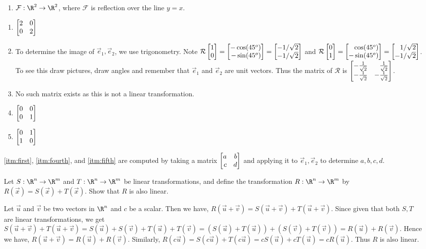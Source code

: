 \begin{exercises}
\begin{problist}
\begin{enumerate}
			\item $\mathcal F:\R^{2}\to\R^{2}$, where $\mathcal F$
				is reflection over the line
				$y=x$.
		\end{enumerate}
		\begin{solution}
			\begin{enumerate}
				\item \label{itm:first} $\mat{2 & 0 \\ 0& 2}$
				\item To determine the image of $\vec{e}_1, \vec{e}_2$, we use trigonometry. Note $\mathcal{R} \mat{1\\0} = \mat{- \cos (45^{o}) \\ - \sin (45^{o})} = \mat{- 1/ \sqrt{2} \\ - 1/ \sqrt{2}}$ and $\mathcal{R} \mat{0\\1} = \mat{ \cos (45^{o}) \\ - \sin (45^{o})} = \mat{ 1/ \sqrt{2} \\  -1/ \sqrt{2}}$. To see this draw pictures, draw angles and remember that $\vec{e}_1$ and $\vec{e}_2$ are unit vectors. Thus the matrix of $\mathcal{R}$ is $\mat{- \frac{1	}{\sqrt{2}} & \frac{1	}{\sqrt{2}}\\ - \frac{1}{\sqrt{2}} & -\frac{1}{\sqrt{2}}}$.
				\item No such matrix exists as this is not a linear transformation.
				\item \label{itm:fourth} $\mat{0 & 0 \\ 0 & 1}$
				\item \label{itm:fifth} $\mat{0 & 1 \\ 1 & 0}$
			\end{enumerate}
			\ref{itm:first}, \ref{itm:fourth}, and \ref{itm:fifth} are computed by taking a matrix $\mat{a & b \\ c & d}$ and applying it to $\vec{e}_1, \vec{e}_2$ to determine $a,b,c,d$.
		\end{solution}

		\prob Let $S:\R^n\to\R^m$ and $T:\R^n\to\R^m$ be linear transformations,
		and define the transformation $R:\R^n\to\R^m$ by $R(\vec x)=S(\vec x)+T(\vec x)$.
		Show that $R$ is also linear.
		\begin{solution}
			Let $\vec{u}$ and $\vec{v}$ be two vectors in $\R^n$ and $c$ be a scalar. Then we have, $R(\vec{u}+ \vec{v}) = S(\vec{u}+ \vec{v}) + T(\vec{u}+ \vec{v})$. Since given that both $S, T$ are linear transformations, we get $S(\vec{u}+ \vec{v}) + T(\vec{u}+ \vec{v}) = S(\vec{u})+ S(\vec{v}) + T(\vec{u})+T (\vec{v}) = (S(\vec{u})+ T(\vec{u})) + (S(\vec{v})+ T(\vec{v})) = R(\vec{u})+ R(\vec{v})$. Hence we have, $R(\vec{u}+ \vec{v})=R(\vec{u})+ R(\vec{v})$. Similarly, $R(c \vec{u})= S(c \vec{u})+T(c \vec{u}) = cS( \vec{u})+cT( \vec{u}) = cR( \vec{u})$. Thus $R$ is also linear.
		\end{solution}


\end{problist}
\end{exercises}
